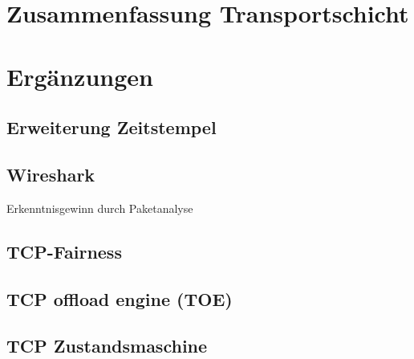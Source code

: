\section{Zusammenfassung Transportschicht}

\section{Ergänzungen}
\subsection{Erweiterung Zeitstempel}
\subsection{Wireshark}
Erkenntnisgewinn durch Paketanalyse
\subsection{TCP-Fairness}
\subsection{TCP offload engine (TOE)}
\subsection{TCP Zustandsmaschine}




